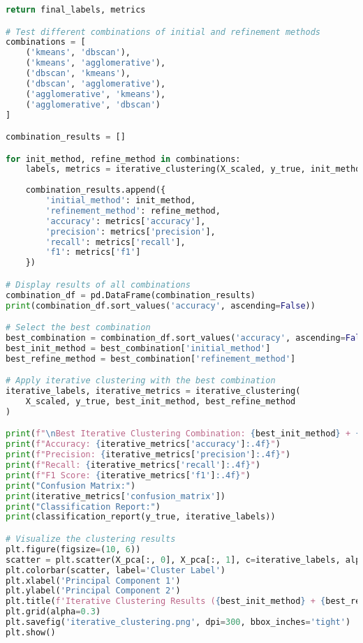 \begin{lstlisting}[language=Python, caption=Iterative Clustering Implementation]
    return final_labels, metrics

# Test different combinations of initial and refinement methods
combinations = [
    ('kmeans', 'dbscan'),
    ('kmeans', 'agglomerative'),
    ('dbscan', 'kmeans'),
    ('dbscan', 'agglomerative'),
    ('agglomerative', 'kmeans'),
    ('agglomerative', 'dbscan')
]

combination_results = []

for init_method, refine_method in combinations:
    labels, metrics = iterative_clustering(X_scaled, y_true, init_method, refine_method)
    
    combination_results.append({
        'initial_method': init_method,
        'refinement_method': refine_method,
        'accuracy': metrics['accuracy'],
        'precision': metrics['precision'],
        'recall': metrics['recall'],
        'f1': metrics['f1']
    })

# Display results of all combinations
combination_df = pd.DataFrame(combination_results)
print(combination_df.sort_values('accuracy', ascending=False))

# Select the best combination
best_combination = combination_df.sort_values('accuracy', ascending=False).iloc[0]
best_init_method = best_combination['initial_method']
best_refine_method = best_combination['refinement_method']

# Apply iterative clustering with the best combination
iterative_labels, iterative_metrics = iterative_clustering(
    X_scaled, y_true, best_init_method, best_refine_method
)

print(f"\nBest Iterative Clustering Combination: {best_init_method} + {best_refine_method}")
print(f"Accuracy: {iterative_metrics['accuracy']:.4f}")
print(f"Precision: {iterative_metrics['precision']:.4f}")
print(f"Recall: {iterative_metrics['recall']:.4f}")
print(f"F1 Score: {iterative_metrics['f1']:.4f}")
print("Confusion Matrix:")
print(iterative_metrics['confusion_matrix'])
print("Classification Report:")
print(classification_report(y_true, iterative_labels))

# Visualize the clustering results
plt.figure(figsize=(10, 6))
scatter = plt.scatter(X_pca[:, 0], X_pca[:, 1], c=iterative_labels, alpha=0.6, cmap='viridis')
plt.colorbar(scatter, label='Cluster Label')
plt.xlabel('Principal Component 1')
plt.ylabel('Principal Component 2')
plt.title(f'Iterative Clustering Results ({best_init_method} + {best_refine_method})')
plt.grid(alpha=0.3)
plt.savefig('iterative_clustering.png', dpi=300, bbox_inches='tight')
plt.show()
\end{lstlisting}

